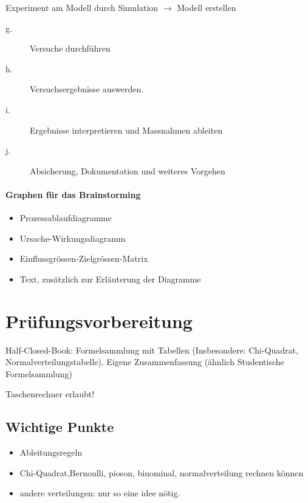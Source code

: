 Experiment am Modell durch Simulation $\rightarrow$ Modell erstellen
\begin{description}
\item[g.] Versuche durchführen
\item[h.] Versuchsergebnisse auswerden.
\item[i.] Ergebnisse interpretieren und Massnahmen ableiten
\item[j.] Absicherung, Dokumentation und weiteres Vorgehen
\end{description}

\paragraph{Graphen für das Brainstorming}
\begin{itemize}
	\item Prozessablaufdiagramme
	\item Ursache-Wirkungsdiagramm
	\item Einflussgrössen-Zielgrössen-Matrix
	\item Text, zusätzlich zur Erläuterung der Diagramme
\end{itemize}



\section{Prüfungsvorbereitung}

Half-Closed-Book: Formelsammlung mit Tabellen (Insbesondere: Chi-Quadrat, Normalverteilungstabelle).
Eigene Zusammenfassung (ähnlich Studentische Formelsammlung)

Taschenrechner erlaubt!

\subsection{Wichtige Punkte}

\begin{itemize}
	\item Ableitungsregeln
	\item Chi-Quadrat,Bernoulli, pioson, binominal, normalverteilung rechnen können
	\item andere verteilungen: nur so eine idee nötig.
\end{itemize}


